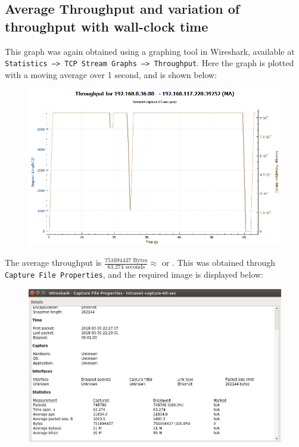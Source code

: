 \documentclass{article}
\begin{document}
\subsection{Average Throughput and variation of throughput with wall-clock time}
\begin{flushleft}
This graph was again obtained using a graphing tool in Wireshark, available at \texttt{Statistics --> TCP Stream Graphs --> Throughput}. Here the graph is plotted with a moving average over 1 second, and is shown below:
\begin{figure}[H]
\centering
\includegraphics[width=0.55\linewidth]{Throughput-variation-60-sec-capture-Ubuntu.png}
\end{figure}

The average throughput is \(\frac{751694437 \text{ Bytes}}{63.274 \text{ seconds}} \approx \)  or . This was obtained through \texttt{Capture File Properties}, and the required image is displayed below:
\begin{figure}[H]
\centering
\includegraphics[width=0.55\linewidth]{Packet-capture-stats-60-sec-capture-Ubuntu.png}
\end{figure}
\end{flushleft}
\end{document}
